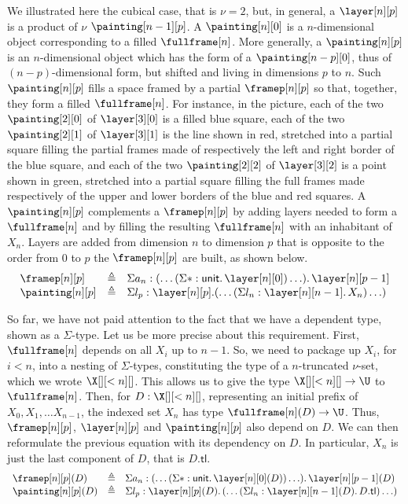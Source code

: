 \documentclass{msc}
\newcommand{\unittype}{\ensuremath{\mathsf{unit}}}
\newcommand{\unitpoint}{\ensuremath{\ast}}
\newcommand{\defeq}{\ensuremath{\triangleq}}
\newcommand{\tl}{\ensuremath{\mathsf{tl}}}
\begin{document}
We illustrated here the cubical case, that is $\nu = 2$, but, in general, a $\layer[n][p]$ is a product of $\nu$ $\painting[n - 1][p]$. A $\painting[n][0]$ is a $n$-dimensional object corresponding to a filled $\fullframe[n]$. More generally, a $\painting[n][p]$ is an $n$-dimensional object which has the form of a $\painting[n-p][0]$, thus of $(n-p)$-dimensional form, but shifted and living in dimensions $p$ to $n$. Such $\painting[n][p]$ fills a space framed by a partial $\framep[n][p]$ so that, together, they form a filled $\fullframe[n]$. For instance, in the picture, each of the two $\painting[2][0]$ of $\layer[3][0]$ is a filled blue square, each of the two $\painting[2][1]$ of $\layer[3][1]$ is the line shown in red, stretched into a partial square filling the partial frames made of respectively the left and right border of the blue square, and each of the two $\painting[2][2]$ of $\layer[3][2]$ is a point shown in green, stretched into a partial square filling the full frames made respectively of the upper and lower borders of the blue and red squares. A $\painting[n][p]$ complements a $\framep[n][p]$ by adding layers needed to form a $\fullframe[n]$ and by filling the resulting $\fullframe[n]$ with an inhabitant of $X_n$. Layers are added from dimension $n$ to dimension $p$ that is opposite to the order from $0$ to $p$ the $\framep[n][p]$ are built, as shown below.
\begin{equation*}
  \begin{array}{lll}
    \framep[n][p]   & \defeq & \Sigma a_n: (\ldots (\Sigma \unitpoint: \unittype .\, \layer[n][0]) \ldots) .\, \layer[n][p - 1] \\
    \painting[n][p] & \defeq & \Sigma l_p: \layer[n][p]. (\ldots (\Sigma l_n: \layer[n][n - 1] .\, X_n) \ldots)
  \end{array}
\end{equation*}

So far, we have not paid attention to the fact that we have a dependent type, shown as a $\Sigma$-type. Let us be more precise about this requirement. First, $\fullframe[n]$ depends on all $X_i$ up to $n - 1$. So, we need to package up $X_i$, for $i < n$, into a nesting of $\Sigma$-types, constituting the type of a $n$-truncated $\nu$-set, which we wrote $\X[][<n][]$. This allows us to give the type $\X[][<n][] \rightarrow \U$ to $\fullframe[n]$. Then, for $D: \X[][<n][]$, representing an initial prefix of $X_0, X_1, \ldots X_{n - 1}$, the indexed set $X_n$ has type $\fullframe[n](D) \rightarrow \U$. Thus, $\framep[n][p]$, $\layer[n][p]$ and $\painting[n][p]$ also depend on $D$. We can then reformulate the previous equation with its dependency on $D$. In particular, $X_n$ is just the last component of $D$, that is $D.\tl$.
\begin{equation*}
  \begin{array}{lll}
    \framep[n][p](D)   & \defeq & \Sigma a_n: (\ldots (\Sigma \unitpoint: \unittype.\, \layer[n][0](D)) \ldots) .\,\layer[n][p - 1](D) \\
    \painting[n][p](D) & \defeq & \Sigma l_p: \layer[n][p](D).\, (\ldots (\Sigma l_n: \layer[n][n - 1](D) .\, D.\tl) \ldots)
  \end{array}
\end{equation*}
\end{document}
